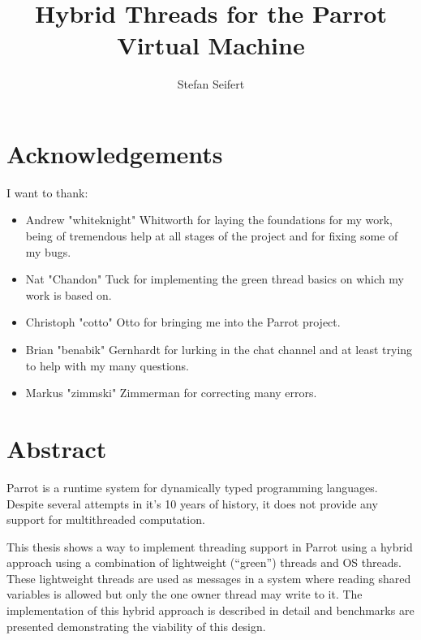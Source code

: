 \documentclass[bachelor,english]{hgbthesis}
\begin{document}
\title{Hybrid Threads for the Parrot Virtual Machine}

\author{Stefan Seifert}


\frontmatter
\maketitle
\tableofcontents

\chapter{Acknowledgements}

I want to thank:
\begin{itemize}
\item{Andrew "whiteknight" Whitworth for laying the foundations for my work, being of tremendous help at all stages of the project and for fixing some of my bugs.}
\item{Nat "Chandon" Tuck for implementing the green thread basics on which my work is based on.}
\item{Christoph "cotto" Otto for bringing me into the Parrot project.}
\item{Brian "benabik" Gernhardt for lurking in the chat channel and at least trying to help with my many questions.}
\item{Markus "zimmski" Zimmerman for correcting many errors.}
\end{itemize}

\chapter{Abstract}

Parrot is a runtime system for dynamically typed programming languages. Despite several attempts in it's 10 years of history, it does not provide any support for multithreaded computation.

This thesis shows a way to implement threading support in Parrot using a hybrid approach using a combination of lightweight (``green'') threads and OS threads. These lightweight threads are used as messages in a system where reading shared variables is allowed but only the one owner thread may write to it. The implementation of this hybrid approach is described in detail and benchmarks are presented demonstrating the viability of this design.
\end{document}
